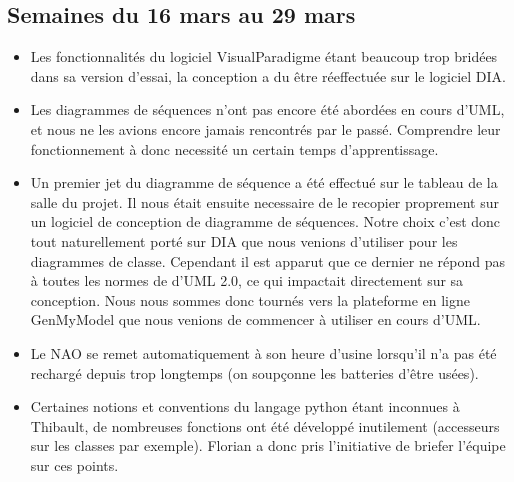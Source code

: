   \subsection{Semaines du 16 mars au 29 mars}
  \label{sub:Semaines du 16 mars au 29 mars}
    \begin{itemize}
      \item Les fonctionnalités du logiciel VisualParadigme étant beaucoup trop bridées dans sa version d'essai, la conception a du être réeffectuée sur le logiciel DIA.
      \item Les diagrammes de séquences n'ont pas encore été abordées en cours d'UML, et nous ne les avions encore jamais rencontrés par le passé.
      Comprendre leur fonctionnement à donc necessité un certain temps d'apprentissage.
      \item Un premier jet du diagramme de séquence a été effectué sur le tableau de la salle du projet.
      Il nous était ensuite necessaire de le recopier proprement sur un logiciel de conception de diagramme de séquences.
      Notre choix c'est donc tout naturellement porté sur DIA que nous venions d'utiliser pour les diagrammes de classe.
      Cependant il est apparut que ce dernier ne répond pas à toutes les normes de d'UML 2.0, ce qui impactait directement sur sa conception.
      Nous nous sommes donc tournés vers la plateforme en ligne GenMyModel que nous venions de commencer à utiliser en cours d'UML.
      \item Le NAO se remet automatiquement à son heure d’usine lorsqu’il n’a pas été rechargé depuis trop longtemps (on soupçonne les batteries d’être usées).
      \item Certaines notions et conventions du langage python étant inconnues à Thibault, de nombreuses fonctions ont été développé inutilement (accesseurs sur les classes par exemple).
      Florian a donc pris l’initiative de briefer l’équipe sur ces points.\\
    \end{itemize}
  \pagebreak


